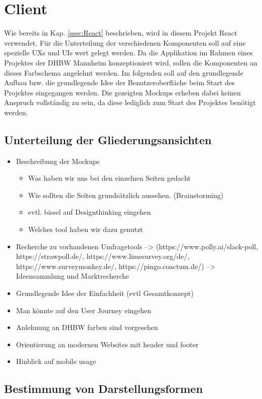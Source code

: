 \section{Client}
\label{sec:ClientKonzept}

Wie bereits in Kap. \vref{ssec:React} beschrieben, wird in diesem Projekt React verwendet. 
Für die Unterteilung der verschiedenen Komponenten soll auf eine spezielle \acfp{UX} und \acfp{UI} wert gelegt werden. 
Da die Applikation im Rahmen eines Projektes der DHBW Mannheim konzeptioniert wird, sollen die Komponenten an dieses Farbschema angelehnt werden. 
Im folgenden soll auf den grundlegende Aufbau bzw. die grundlegende Idee der Benutzeroberfläche beim Start des Projektes eingegangen werden. 
Die gezeigten Mockups erheben dabei keinen Anspruch vollständig zu sein, da diese lediglich zum Start des Projektes benötigt werden.















\subsection{Unterteilung der Gliederungsansichten}

\begin{itemize}
	\item Beschreibung der Mockups 
	 \begin{itemize}
		 \item Was haben wir uns bei den einzelnen Seiten gedacht
		 \item Wie sollten die Seiten grundsätzlich aussehen. (Brainstorming)
		 \item evtl. bissel auf Designthinking eingehen
		 \item Welches tool haben wir dazu genutzt
	 \end{itemize}
	 \item Recherche zu vorhandenen Umfragetools --> (https://www.polly.ai/slack-poll, https://strawpoll.de/, https://www.limesurvey.org/de/, https://www.surveymonkey.de/, https://pingo.coactum.de/)
	 --> Ideensammlung und Marktrecherche
	 \item Grundlegende Idee der Einfachheit (evtl Gesamtkonzept)
	 \item Man könnte auf den User Journey eingehen
	 \item Anlehnung an DHBW farben sind vorgesehen
	 \item Orientierung an modernen Websites mit header und footer
	 \item Hinblick auf mobile usage
\end{itemize}

\subsection{Bestimmung von Darstellungsformen}